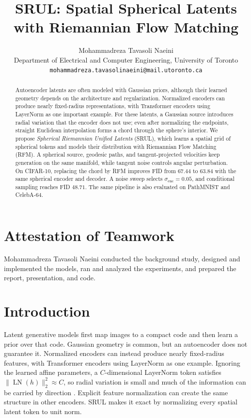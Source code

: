\documentclass{article}
\title{SRUL: Spatial Spherical Latents with Riemannian Flow Matching}
\author{Mohammadreza Tavasoli Naeini \\
Department of Electrical and Computer Engineering, University of Toronto \\
\texttt{mohammadreza.tavasolinaeini@mail.utoronto.ca}}
\begin{document}
\maketitle

\begin{abstract}
Autoencoder latents are often modeled with Gaussian priors, although their learned geometry depends on the architecture and regularization. Normalized encoders can produce nearly fixed-radius representations, with Transformer encoders using LayerNorm as one important example. For these latents, a Gaussian source introduces radial variation that the encoder does not use; even after normalizing the endpoints, straight Euclidean interpolation forms a chord through the sphere's interior. We propose \emph{Spherical Riemannian Unified Latents} (SRUL), which learns a spatial grid of spherical tokens and models their distribution with Riemannian Flow Matching (RFM). A spherical source, geodesic paths, and tangent-projected velocities keep generation on the same manifold, while tangent noise controls angular perturbation. On CIFAR-10, replacing the chord by RFM improves FID from $67.44$ to $63.84$ with the same spherical encoder and decoder. A noise sweep selects $\sigma_{\mathrm{enc}}=0.05$, and conditional sampling reaches FID $48.71$. The same pipeline is also evaluated on PathMNIST and CelebA-64.
\end{abstract}

\section*{Attestation of Teamwork}
Mohammadreza Tavasoli Naeini conducted the background study, designed and implemented the models, ran and analyzed the experiments, and prepared the report, presentation, and code.

\section{Introduction}
Latent generative models first map images to a compact code and then learn a prior over that code. Gaussian geometry is common, but an autoencoder does not guarantee it. Normalized encoders can instead produce nearly fixed-radius features, with Transformer encoders using LayerNorm as one example. Ignoring the learned affine parameters, a $C$-dimensional LayerNorm token satisfies $\|\operatorname{LN}(h)\|_2^2\approx C$, so radial variation is small and much of the information can be carried by direction \cite{rjf}. Explicit feature normalization can create the same structure in other encoders. SRUL makes it exact by normalizing every spatial latent token to unit norm.
\end{document}
